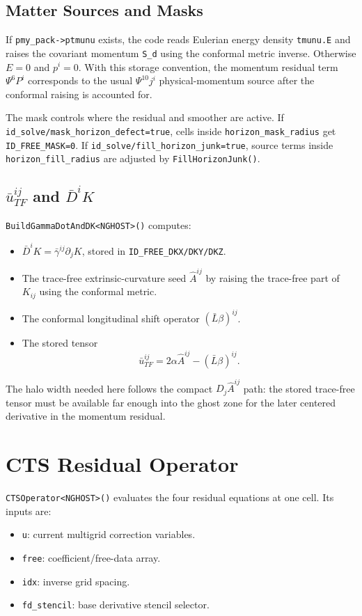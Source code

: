 \documentclass[11pt]{article}
\newcommand{\code}[1]{\texttt{#1}}
\begin{document}
\subsection{Matter Sources and Masks}

If \code{pmy\_pack->ptmunu} exists, the code reads Eulerian energy density
\code{tmunu.E} and raises the covariant momentum \code{S\_d} using the conformal
metric inverse.  Otherwise \(E=0\) and \(p^i=0\).  With this storage convention,
the momentum residual term \(\Psi^6 P^i\) corresponds to the usual
\(\Psi^{10}j^i\) physical-momentum source after the conformal raising is
accounted for.

The mask controls where the residual and smoother are active.  If
\code{id\_solve/mask\_horizon\_defect=true}, cells inside
\code{horizon\_mask\_radius} get \code{ID\_FREE\_MASK=0}.  If
\code{id\_solve/fill\_horizon\_junk=true}, source terms inside
\code{horizon\_fill\_radius} are adjusted by \code{FillHorizonJunk()}.

\subsection{\(\bar{u}^{ij}_{TF}\) and \(\bar{D}^i K\)}

\code{BuildGammaDotAndDK<NGHOST>()} computes:
\begin{itemize}
  \item \(\bar{D}^i K = \bar{\gamma}^{ij}\partial_j K\), stored in
        \code{ID\_FREE\_DKX/DKY/DKZ}.
  \item The trace-free extrinsic-curvature seed \( \hat{A}^{ij} \) by raising the
        trace-free part of \(K_{ij}\) using the conformal metric.
  \item The conformal longitudinal shift operator \((\bar{L}\beta)^{ij}\).
  \item The stored tensor
        \[
          \bar{u}^{ij}_{TF} = 2\alpha\hat{A}^{ij} - (\bar{L}\beta)^{ij}.
        \]
\end{itemize}

The halo width needed here follows the compact \(D_j\hat{A}^{ij}\) path: the
stored trace-free tensor must be available far enough into the ghost zone for
the later centered derivative in the momentum residual.

\section{CTS Residual Operator}

\code{CTSOperator<NGHOST>()} evaluates the four residual equations at one cell.
Its inputs are:
\begin{itemize}
  \item \code{u}: current multigrid correction variables.
  \item \code{free}: coefficient/free-data array.
  \item \code{idx}: inverse grid spacing.
  \item \code{fd\_stencil}: base derivative stencil selector.
\end{itemize}
\end{document}
